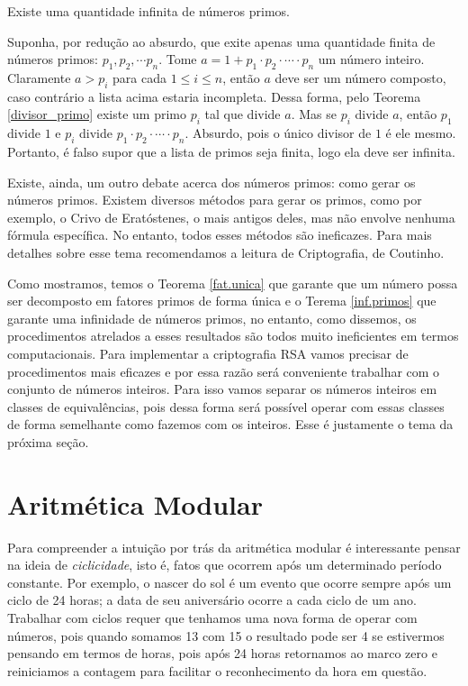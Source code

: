 \begin{Th}\label{inf.primos}
Existe uma quantidade infinita de n\'umeros primos.
\end{Th}

\newline
Suponha, por redu\c{c}\~ao ao absurdo, que exite apenas uma quantidade finita de n\'umeros primos: $p_1, p_2,\cdots p_n$. Tome $a=1+p_1\cdot p_2\cdot \cdots \cdot p_n$ um n\'umero inteiro. Claramente $a>p_i$ para cada $1\leq i\leq n$, ent\~ao $a$ deve ser um n\'umero composto, caso contr\'ario a 
lista acima estaria incompleta. Dessa forma, pelo Teorema \ref{divisor_primo} existe um primo $p_i$ tal que divide $a$. Mas se $p_i$ divide $a$, ent\~ao $p_1$ divide $1$ e $p_i$ divide $p_1\cdot p_2\cdot \cdots \cdot p_n$. Absurdo, pois o \'unico divisor de $1$ \'e ele mesmo. Portanto, \'e falso supor que a lista de primos seja finita, logo ela deve ser infinita.
\hfill\newline

Existe, ainda, um outro debate acerca dos n\'umeros primos: como gerar os n\'umeros primos. Existem diversos m\'etodos para gerar os primos, como por exemplo, o Crivo de Erat\'ostenes, o mais antigos deles, mas n\~ao envolve nenhuma f\'ormula espec\'ifica. No entanto, todos esses m\'etodos s\~ao ineficazes. Para mais detalhes sobre esse tema recomendamos a leitura de Criptografia, de Coutinho\cite{coutinho}.

Como mostramos, temos o Teorema \ref{fat.unica} que garante que um n\'umero possa ser decomposto
em fatores primos de forma \'unica e o Terema \ref{inf.primos} que garante uma infinidade de n\'umeros primos, no entanto, como dissemos, os procedimentos atrelados a esses resultados s\~ao todos muito ineficientes em termos computacionais. Para implementar a criptografia RSA vamos precisar de procedimentos mais eficazes e por essa raz\~ao ser\'a conveniente trabalhar com o conjunto de n\'umeros inteiros. Para isso vamos separar os n\'umeros inteiros em classes de equival\^encias, pois dessa forma ser\'a poss\'ivel operar com essas classes de forma semelhante como fazemos com os inteiros. Esse \'e justamente o tema da pr\'oxima se\c{c}\~ao.  


\section{Aritm\'etica Modular}

\hspace{7mm}Para compreender a intui\c{c}\~ao por tr\'as da aritm\'etica modular \'e interessante pensar na ideia de \textit{ciclicidade}, isto \'e, fatos que ocorrem ap\'os um determinado per\'iodo constante. Por exemplo, o nascer do sol \'e um evento que ocorre sempre ap\'os um ciclo de 24 horas; a data de seu anivers\'ario ocorre a cada ciclo de um ano. Trabalhar com ciclos requer que tenhamos uma nova forma de operar com n\'umeros, pois quando somamos 13 com 15 o resultado pode ser 4 se estivermos pensando em termos de horas, pois ap\'os 24 horas retornamos ao marco zero e reiniciamos a contagem para facilitar o reconhecimento da hora em quest\~ao. 

